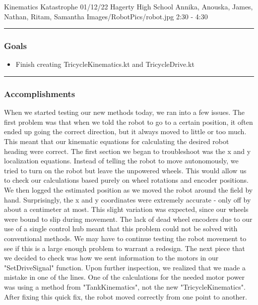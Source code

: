 \insertmeeting 
	{Kinematics Katastrophe} 
	{01/12/22} 
	{Hagerty High School}
	{Annika, Anouska, James, Nathan, Ritam, Samantha}
	{Images/RobotPics/robot.jpg}
	{2:30 - 4:30}
	
\noindent\hfil\rule{\textwidth}{.4pt}\hfil
\subsubsection*{Goals}
\begin{itemize}
    \item Finish creating TricycleKinematics.kt and TricycleDrive.kt  

\end{itemize} 

\noindent\hfil\rule{\textwidth}{.4pt}\hfil

\subsubsection*{Accomplishments}
When we started testing our new methods today, we ran into a few issues. The first problem was that when we told the robot to go to a certain position, it often ended up going the correct direction, but it always moved to little or too much. This meant that our kinematic equations for calculating the desired robot heading were correct. The first section we began to troubleshoot was the x and y localization equations. Instead of telling the robot to move autonomously, we tried to turn on the robot but leave the unpowered wheels. This would allow us to check our calculations based purely on wheel rotations and encoder positions. We then logged the estimated position as we moved the robot around the field by hand. Surprisingly, the x and y coordinates were extremely accurate - only off by about a centimeter at most. This slight variation was expected, since our wheels were bound to slip during movement. The lack of dead wheel encoders due to our use of a single control hub meant that this problem could not be solved with conventional methods. We may have to continue testing the robot movement to see if this is a large enough problem to warrant a redesign. The next piece that we decided to check was how we sent information to the motors in our "SetDriveSignal" function. Upon further inspection, we realized that we made a mistake in one of the lines. One of the calculations for the needed motor power was using a method from "TankKinematics", not the new "TricycleKinematics". After fixing this quick fix, the robot moved correctly from one point to another. 

